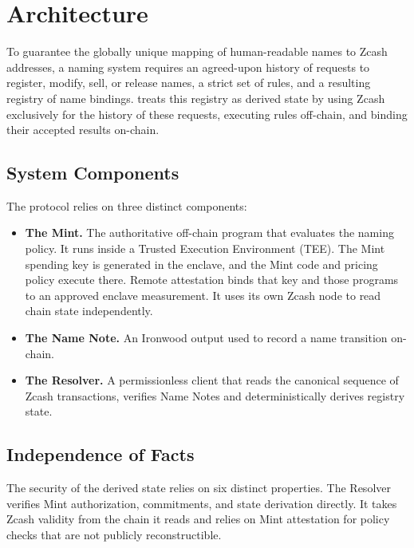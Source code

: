 \section{Architecture}
\label{sec:architecture}

To guarantee the globally unique mapping of human-readable names to Zcash addresses, a naming system requires an agreed-upon history of requests to register, modify, sell, or release names, a strict set of rules, and a resulting registry of name bindings. \zns{} treats this registry as derived state by using Zcash exclusively for the history of these requests, executing rules off-chain, and binding their accepted results on-chain.

\subsection{System Components}

The protocol relies on three distinct components:

\begin{itemize}
  \item \textbf{The Mint.} The authoritative off-chain program that evaluates the naming policy. It runs inside a Trusted Execution Environment (TEE). The Mint spending key is generated in the enclave, and the Mint code and pricing policy execute there. Remote attestation binds that key and those programs to an approved enclave measurement. It uses its own Zcash node to read chain state independently.
  \item \textbf{The Name Note.} An Ironwood output used to record a name transition on-chain.
  \item \textbf{The Resolver.} A permissionless client that reads the canonical sequence of Zcash transactions, verifies Name Notes and deterministically derives registry state.
\end{itemize}

\subsection{Independence of Facts}

The security of the derived state relies on six distinct properties. The Resolver verifies Mint authorization, commitments, and state derivation directly. It takes Zcash validity from the chain it reads and relies on Mint attestation for policy checks that are not publicly reconstructible.

